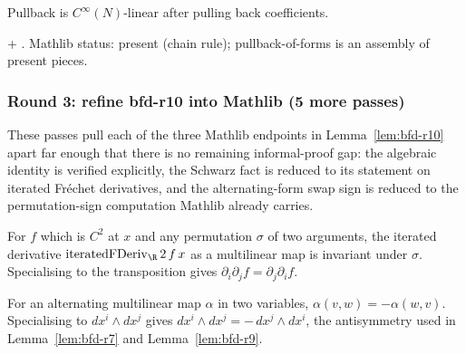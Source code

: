 \begin{lemma}
\label{lem:bfp-r14}
Pullback is $C^{\infty}(N)$-linear after pulling back coefficients.
\leanok
\end{lemma}

\begin{lemma}
\label{lem:bfp-r15}
 + .  Mathlib status: present (chain rule); pullback-of-forms is an assembly of present pieces.
\leanok\mathlibok
\end{lemma}

\subsubsection*{Round 3: refine bfd-r10 into Mathlib (5 more passes)}

These passes pull each of the three Mathlib endpoints in
Lemma~\ref{lem:bfd-r10} apart far enough that there is no remaining
informal-proof gap: the algebraic identity is verified explicitly,
the Schwarz fact is reduced to its statement on iterated Fr\'echet
derivatives, and the alternating-form swap sign is reduced to the
permutation-sign computation Mathlib already carries.

\begin{lemma}
\label{lem:bfd-r11}
For $f$ which is $C^{2}$ at $x$ and any permutation $\sigma$ of two
arguments, the iterated derivative
$\mathrm{iteratedFDeriv}_{\R}\,2\,f\,x$ as a multilinear map is
invariant under $\sigma$.  Specialising to the transposition gives
$\partial_{i}\partial_{j}f = \partial_{j}\partial_{i}f$.
\leanok\mathlibok
\end{lemma}

\begin{lemma}
\label{lem:bfd-r12}
For an alternating multilinear map $\alpha$ in two variables,
$\alpha(v,w) = -\alpha(w,v)$.  Specialising to $dx^{i}\wedge dx^{j}$
gives $dx^{i}\wedge dx^{j} = -\,dx^{j}\wedge dx^{i}$, the
antisymmetry used in Lemma~\ref{lem:bfd-r7} and Lemma~\ref{lem:bfd-r9}.
\leanok\mathlibok
\end{lemma}

